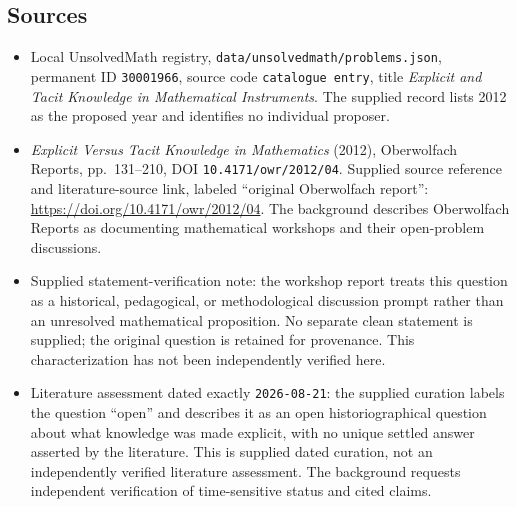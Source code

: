 \documentclass[11pt]{article}
\begin{document}
\subsection{Sources}
\begin{itemize}
\item Local UnsolvedMath registry, \texttt{data/unsolvedmath/problems.json}, permanent ID \texttt{30001966}, source code \texttt{catalogue entry}, title \emph{Explicit and Tacit Knowledge in Mathematical Instruments}. The supplied record lists 2012 as the proposed year and identifies no individual proposer.
\item \emph{Explicit Versus Tacit Knowledge in Mathematics} (2012), Oberwolfach Reports, pp.\ 131--210, DOI \texttt{10.4171/owr/2012/04}. Supplied source reference and literature-source link, labeled ``original Oberwolfach report'': \url{https://doi.org/10.4171/owr/2012/04}. The background describes Oberwolfach Reports as documenting mathematical workshops and their open-problem discussions.
\item Supplied statement-verification note: the workshop report treats this question as a historical, pedagogical, or methodological discussion prompt rather than an unresolved mathematical proposition. No separate clean statement is supplied; the original question is retained for provenance. This characterization has not been independently verified here.
\item Literature assessment dated exactly \texttt{2026-08-21}: the supplied curation labels the question ``open'' and describes it as an open historiographical question about what knowledge was made explicit, with no unique settled answer asserted by the literature. This is supplied dated curation, not an independently verified literature assessment. The background requests independent verification of time-sensitive status and cited claims.
\end{itemize}
\end{document}
